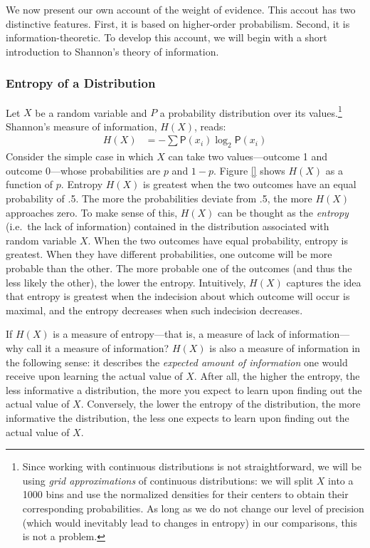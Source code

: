 \documentclass[
  10pt,
  dvipsnames,enabledeprecatedfontcommands]{scrartcl}
\begin{document}
We now present our own account of the weight of evidence. This accout
has two distinctive features. First, it is based on higher-order
probabilism. Second, it is information-theoretic. To develop this
account, we will begin with a short introduction to Shannon's theory of
information.

\hypertarget{entropy-of-a-distribution}{%
\subsubsection{Entropy of a
Distribution}\label{entropy-of-a-distribution}}

Let \(X\) be a random variable and \(P\) a probability distribution over
its values.\footnote{Since working with continuous distributions is not
  straightforward, we will be using \emph{grid approximations} of
  continuous distributions: we will split \(X\) into a 1000 bins and use
  the normalized densities for their centers to obtain their
  corresponding probabilities. As long as we do not change our level of
  precision (which would inevitably lead to changes in entropy) in our
  comparisons, this is not a problem.} Shannon's measure of information,
\(H(X)\), reads: \begin{align*}
H(X)  & =
- \sum \mathsf{P}(x_i) \log_2 \mathsf{P}(x_i)
\end{align*} \noindent  Consider the simple case in which \(X\) can take
two values---outcome 1 and outcome 0---whose probabilities are \(p\) and
\(1-p\). Figure \ref{}  shows \(H(X)\) as a
function of \(p\). Entropy \(H(X)\) is greatest when the two outcomes
have an equal probability of .5. The more the probabilities deviate from
.5, the more \(H(X)\) approaches zero. To make sense of this, \(H(X)\)
can be thought as the \textit{entropy} (i.e.~the lack of information)
contained in the distribution associated with random variable \(X\).
When the two outcomes have equal probability, entropy is greatest. When
they have different probabilities, one outcome will be more probable
than the other. The more probable one of the outcomes (and thus the less
likely the other), the lower the entropy. Intuitively, \(H(X)\) captures
the idea that entropy is greatest when the indecision about which
outcome will occur is maximal, and the entropy decreases when such
indecision decreases.

If \(H(X)\) is a measure of entropy---that is, a measure of lack of
information---why call it a measure of information? \(H(X)\) is also a
measure of information in the following sense: it describes the
\textit{expected amount of information} one would receive upon learning
the actual value of \(X\). After all, the higher the entropy, the less
informative a distribution, the more you expect to learn upon finding
out the actual value of \(X\). Conversely, the lower the entropy of the
distribution, the more informative the distribution, the less one
expects to learn upon finding out the actual value of \(X\).
\end{document}
